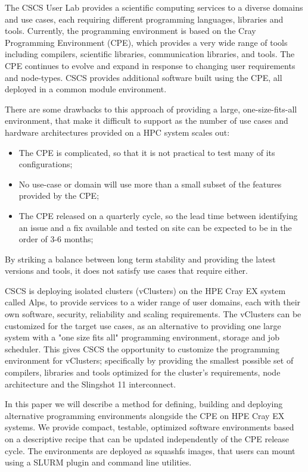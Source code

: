 The CSCS User Lab provides a scientific computing services to a diverse domains and use cases, each requiring different programming languages, libraries and tools.
Currently, the programming environment is based on the Cray Programming Environment (CPE), which provides a very wide range of tools including compilers, scientific libraries, communication libraries, and tools.
The CPE continues to evolve and expand in response to changing user requirements and node-types.
CSCS provides additional software built using the CPE, all deployed in a common module environment.

There are some drawbacks to this approach of providing a large, one-size-fits-all environment, that make it difficult to support as the number of use cases and hardware architectures provided on a HPC system scales out: 
\begin{itemize}
    \item The CPE is complicated, so that it is not practical to test many of its configurations;
    \item No use-case or domain will use more than a small subset of the features provided by the CPE;
    \item The CPE released on a quarterly cycle, so the lead time between identifying an issue and a fix available and tested on site can be expected to be in the order of 3-6 months;
\end{itemize}
By striking a balance between long term stability and providing the latest versions and tools, it does not satisfy use cases that require either.

CSCS is deploying isolated clusters (vClusters) on the HPE Cray EX system called Alps, to provide services to a wider range of user domains, each with their own software, security, reliability and scaling requirements.
The vClusters can be customized for the target use cases, as an alternative to providing one large system with a "one size fits all" programming environment, storage and job scheduler.
This gives CSCS the opportunity to customize the programming environment for vClusters; specifically by providing the smallest possible set of compilers, libraries and tools optimized for the cluster's requirements, node architecture and the Slingshot 11 interconnect.

In this paper we will describe a method for defining, building and deploying alternative programming environments alongside the CPE on HPE Cray EX systems.
We provide compact, testable, optimized software environments based on a descriptive recipe that can be updated independently of the CPE release cycle.
The environments are deployed as squashfs images, that users can mount using a SLURM plugin and command line utilities.
